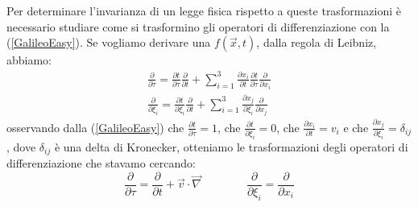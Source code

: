 Per determinare l'invarianza di un legge fisica rispetto a queste trasformazioni è necessario 
studiare come si trasformino gli operatori di differenziazione con la  (\ref{GalileoEasy}). 
Se vogliamo derivare una $f(\vec{x},t)$, dalla regola di Leibniz, abbiamo:
\begin{equation*}
	\begin{gathered}
		\frac{\partial}{\partial \tau}=\frac{\partial t}{\partial \tau}\frac{\partial}{\partial t}+
		\sum_{i=1}^{3}\frac{\partial x_i}{\partial t}\frac{\partial t}{\partial \tau}
		\frac{\partial}{\partial x_i} \\
		\frac{\partial}{\partial \xi_i}=\frac{\partial t}{\partial \xi_i}\frac{\partial}{\partial t}+
		\sum_{i=1}^{3}\frac{\partial x_j}{\partial \xi_i}\frac{\partial}{\partial x_j}
	\end{gathered}
\end{equation*}
osservando dalla (\ref{GalileoEasy}) che $\frac{\partial t}{\partial \tau}=1$, che 
$\frac{\partial t}{\partial \xi_i}=0$, che $\frac{\partial x_i}{\partial t}=v_i$ e che 
$\frac{\partial x_j}{\partial \xi_i}=\delta_{ij}$, dove $\delta_{ij}$ è una delta di Kronecker, 
otteniamo le trasformazioni degli operatori di differenziazione che stavamo cercando:
\begin{equation}
	\frac{\partial}{\partial \tau}=\frac{\partial}{\partial t}+\vec{v}\cdot\vec{\nabla} \qquad \qquad
	\frac{\partial}{\partial \xi_i}=\frac{\partial}{\partial x_i}
\end{equation}
\newpage